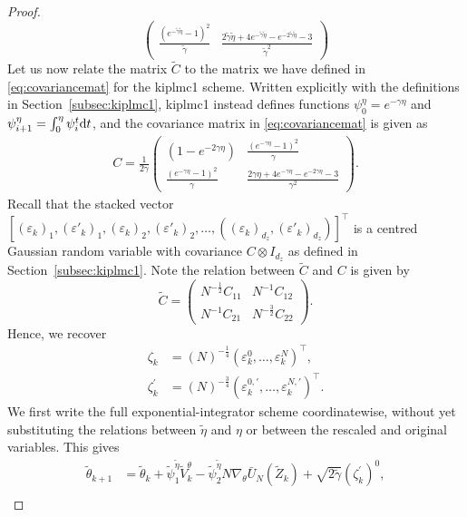 \begin{proof}
\begin{equation*}
\begin{pmatrix}
    \frac{(e^{-\tilde{\gamma}\tilde{\eta}} -1)^2}{\tilde{\gamma}} &  \frac{2\tilde{\gamma}\tilde{\eta} + 4 e^{-\tilde{\gamma}\tilde{\eta}}- e^{-2\tilde{\gamma}\tilde{\eta}} -3}{\tilde{\gamma}^2}
\end{pmatrix}
\end{equation*}
\normalsize
Let us now relate the matrix $\widetilde{C}$ to the matrix we have defined in \eqref{eq:covariancemat} for the \gls*{kiplmc1} scheme. Written explicitly with the definitions in Section~\ref{subsec:kiplmc1}, \gls*{kiplmc1} instead defines functions $\psi_0^\eta = e^{-\gamma \eta}$ and $\psi_{i+1}^\eta = \int_0^\eta \psi_i^t {\mathrm d} t$, and the covariance matrix in \eqref{eq:covariancemat} is given as
\begin{align*}
C=\frac{1}{2\gamma}
\begin{pmatrix}
    (1-e^{- 2 \gamma\eta}) & \frac{(e^{- \gamma\eta}-1)^2}{\gamma}\\
    \frac{(e^{-\gamma\eta}-1)^2}{\gamma} & \frac{2\gamma\eta + 4e^{-\gamma\eta} - e^{-2\gamma\eta}-3}{\gamma^2}
\end{pmatrix}.
\end{align*}
Recall that the stacked vector $[(\varepsilon_k)_1, (\varepsilon'_k)_1, (\varepsilon_k)_2, (\varepsilon'_k)_2, \dots, ((\varepsilon_k)_{d_z}, (\varepsilon'_k)_{d_z})]^\top$ is a centred Gaussian random variable with covariance $C\otimes I_{d_z}$ as defined in Section~\ref{subsec:kiplmc1}. Note the relation between $\widetilde{C}$ and $C$ is given by
\begin{equation*}
    \widetilde{C}= \begin{pmatrix}
        N^{-\frac{1}{2}} C_{11} & N^{-1} C_{12}\\
        N^{-1} C_{21} & N^{-\frac{3}{2}} C_{22}
    \end{pmatrix}.
\end{equation*}
Hence, we recover
\begin{align*}
\zeta_{k} &= (N)^{-\frac{1}{4}} (\varepsilon_k^0, \dots, \varepsilon_k^N)^\top,\\
\zeta_k^\prime &= (N)^{-\frac{3}{4}} (\varepsilon^{0,\prime}_k, \dots, \varepsilon_k^{N,\prime})^\top.
\end{align*}
We first write the full exponential-integrator scheme coordinatewise, without yet substituting the relations between $\tilde{\eta}$ and $\eta$ or between the rescaled and original variables. This gives
\small
\begin{align*}
\widetilde{\theta}_{k+1} &= \widetilde{\theta}_k + \tilde{\psi}_1^{\tilde{\eta}} \widetilde{V}^\theta_k - \tilde{\psi}_2^{\tilde{\eta}} N \nabla_\theta \bar U_N(\widetilde{Z}_k) + \sqrt{2\tilde{\gamma}}(\zeta_{k}^\prime)^0,\\

\end{align*}
\end{proof}
